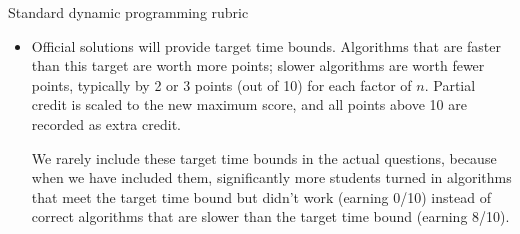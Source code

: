 \documentclass[11pt]{article}
\begin{document}
\begin{Rubric}{Standard dynamic programming rubric}
\begin{itemize}
\item
Official solutions will provide target time bounds.  Algorithms that are faster than this target are worth more points; slower algorithms are worth fewer points, typically by 2 or 3 points (out of 10) for each factor of $n$.  Partial credit is scaled to the new maximum score, and all points above 10 are recorded as extra credit.

\qquad We rarely include these target time bounds in the actual questions, because when we have included them, significantly more students turned in algorithms that meet the target time bound but didn’t work (earning 0/10) instead of correct algorithms that are slower than the target time bound (earning 8/10).
\end{itemize}

\end{Rubric}
\end{document}
